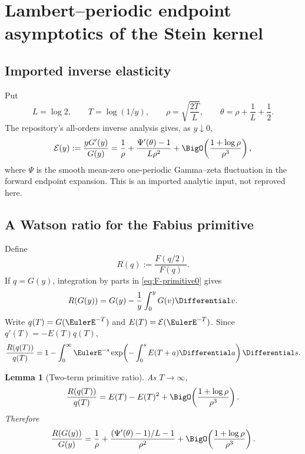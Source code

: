 \documentclass[11pt,a4paper]{article}
\newtheorem{lemma}[theorem]{Lemma}
\theoremstyle{definition}
\theoremstyle{remark}
\begin{document}
\section{Lambert--periodic endpoint asymptotics of the Stein kernel}
\label{sec:endpoint}

\subsection{Imported inverse elasticity}

Put
\begin{equation}
 L=\log2,
 \qquad
 T=\log(1/y),
 \qquad
 \rho=\sqrt{\frac{2T}{L}},
 \qquad
 \theta=\rho+\frac1L+\frac12.
 \label{eq:endpoint-vars}
\end{equation}
The repository's all-orders inverse analysis gives, as $y\downarrow0$,
\begin{equation}
 \mathcal E(y):=\frac{yG'(y)}{G(y)}
 =\frac1\rho+
 \frac{\Psi'(\theta)-1}{L\rho^2}
 +\BigO\!\left(\frac{1+\log\rho}{\rho^3}\right),
 \label{eq:elasticity-input}
\end{equation}
where $\Psi$ is the smooth mean-zero one-periodic Gamma--zeta fluctuation in the forward endpoint expansion. This is an imported analytic input, not reproved here.

\subsection{A Watson ratio for the Fabius primitive}

Define
\begin{equation}
 R(q):=\frac{F(q/2)}{F(q)}.
 \label{eq:Rq}
\end{equation}
If $q=G(y)$, integration by parts in \eqref{eq:F-primitive0} gives
\begin{equation}
 R(G(y))=G(y)-\frac1y\int_0^yG(v)\Differential v.
 \label{eq:R-inverse}
\end{equation}
Write $q(T)=G(\EulerE^{-T})$ and $E(T)=\mathcal E(\EulerE^{-T})$. Since $q'(T)=-E(T)q(T)$,
\begin{equation}
 \frac{R(q(T))}{q(T)}
 =1-\int_0^\infty \EulerE^{-s}
 \exp\!\left(-\int_0^sE(T+a)\Differential a\right)\Differential s.
 \label{eq:Watson-exact}
\end{equation}

\begin{lemma}[Two-term primitive ratio]
\label{lem:R-asymptotic}
As $T\to\infty$,
\begin{equation}
 \frac{R(q(T))}{q(T)}
 =E(T)-E(T)^2
 +\BigO\!\left(\frac{1+\log\rho}{\rho^3}\right).
 \label{eq:R-E}
\end{equation}
Therefore
\begin{equation}
 \frac{R(G(y))}{G(y)}
 =\frac1\rho+
 \frac{(\Psi'(\theta)-1)/L-1}{\rho^2}
 +\BigO\!\left(\frac{1+\log\rho}{\rho^3}\right).
 \label{eq:R-rho}
\end{equation}
\end{lemma}
\end{document}
